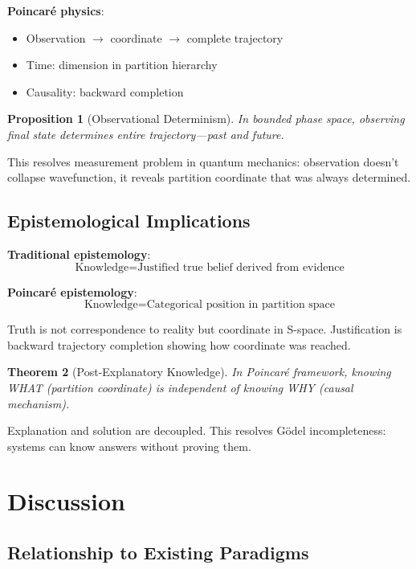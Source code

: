 \documentclass[twocolumn,10pt]{article}
\newtheorem{theorem}{Theorem}
\newtheorem{proposition}[theorem]{Proposition}
\begin{document}
\textbf{Poincaré physics}:
\begin{itemize}
\item Observation $\to$ coordinate $\to$ complete trajectory
\item Time: dimension in partition hierarchy
\item Causality: backward completion
\end{itemize}

\begin{proposition}[Observational Determinism]
In bounded phase space, observing final state determines entire trajectory—past and future.
\end{proposition}

This resolves measurement problem in quantum mechanics: observation doesn't collapse wavefunction, it reveals partition coordinate that was always determined.

\subsection{Epistemological Implications}

\textbf{Traditional epistemology}:
\begin{equation}
\text{Knowledge} = \text{Justified true belief derived from evidence}
\end{equation}

\textbf{Poincaré epistemology}:
\begin{equation}
\text{Knowledge} = \text{Categorical position in partition space}
\end{equation}

Truth is not correspondence to reality but coordinate in S-space. Justification is backward trajectory completion showing how coordinate was reached.

\begin{theorem}[Post-Explanatory Knowledge]
In Poincaré framework, knowing WHAT (partition coordinate) is independent of knowing WHY (causal mechanism).
\end{theorem}

Explanation and solution are decoupled. This resolves Gödel incompleteness: systems can know answers without proving them.

\section{Discussion}

\subsection{Relationship to Existing Paradigms}
\end{document}
